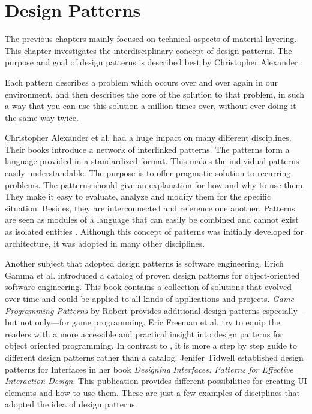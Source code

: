 \chapter{Design Patterns}\label{chapter:designPatterns}

The previous chapters mainly focused on technical aspects of material layering. This chapter investigates the interdisciplinary concept of design patterns. The purpose and goal of design patterns is described best by Christopher Alexander \cite[p.\,10]{alexander1977pattern}:  

\begin{itquote}
Each pattern describes a problem which occurs over and over again in our environment, and then describes the core of the solution to that problem, in such a way that you can use this solution a million times over, without ever doing it the same way twice. 
\end{itquote}%

Christopher Alexander et al. \cites{alexander1977pattern,alexander1979timeless} had a huge impact on many different disciplines. Their books introduce a network of interlinked patterns. The patterns form a language provided in a standardized format. This makes the individual patterns easily understandable. The purpose is to offer pragmatic solution to recurring problems. The patterns should give an explanation for how and why to use them. They make it easy to evaluate, analyze and modify them for the specific situation. Besides, they are interconnected and reference one another. Patterns are seen as modules of a language that can easily be combined and cannot exist as isolated entities \cite[p.\,10--13]{alexander1977pattern}. Although this concept of patterns was initially developed for architecture, it was adopted in many other disciplines. 

Another subject that adopted design patterns is software engineering. Erich Gamma et al. \cite{gamma1995design} introduced a catalog of proven design patterns for object-oriented software engineering. This book contains a collection of solutions that evolved over time and could be applied to all kinds of applications and projects. \emph{Game Programming Patterns} by Robert \cite{nystrom2014game} provides additional design patterns especially---but not only---for game programming.
Eric Freeman et al. \cite{freeman2004head} try to equip the readers with a more accessible and practical insight into design patterns for object oriented programming. In contrast to \cite{gamma1995design}, it is more a step by step guide to different design patterns rather than a catalog. Jenifer Tidwell \cite{tidwell2010designing} established design patterns for Interfaces in her book \emph{Designing Interfaces: Patterns for Effective Interaction Design}. This publication provides different possibilities for creating UI elements and how to use them. These are just a few examples of disciplines that adopted the idea of design patterns. 

